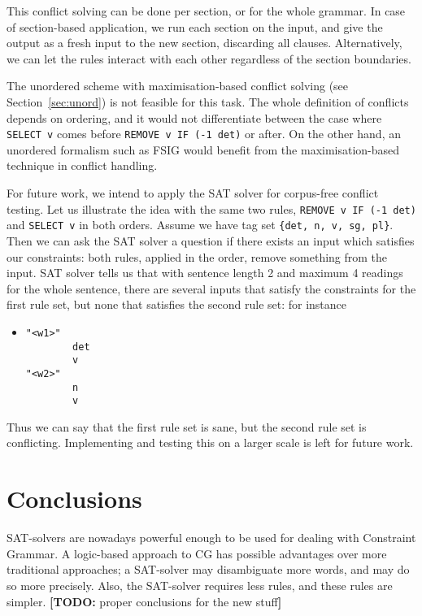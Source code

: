 \documentclass[11pt]{article}
\newcommand{\todo}[1]{{\color{cyan}\textbf{[TODO: }#1\textbf{]}}}
\begin{document}
This conflict solving can be done per section, or for the whole grammar. 
In case of section-based application, we run each section on the
input, and give the output as a fresh input to the new section, discarding
all clauses. Alternatively, we can let the rules interact with each
other regardless of the section boundaries.

The unordered scheme with maximisation-based conflict solving (see Section~\ref{sec:unord}) is not feasible for this task. 
The whole definition of conflicts depends on ordering, and it would
not differentiate between the case where \texttt{SELECT v} comes
before \texttt{REMOVE v IF (-1 det)} or after.
On the other hand, an unordered formalism such as FSIG would benefit from the
maximisation-based technique in conflict handling.

For future work, we intend to apply the SAT solver for corpus-free
conflict testing. Let us illustrate the idea with the same two rules,
\texttt{REMOVE v IF (-1 det)} and \texttt{SELECT v}
in both orders.
Assume we have tag set \texttt{\{det, n, v, sg, pl\}}. Then we
can ask the SAT solver a question if there exists an input which
satisfies our constraints: both rules, applied in the order, remove
something from the input.
SAT solver tells us that with sentence length 2 and maximum 4 readings
for the whole sentence, there are several inputs that
satisfy the constraints for the first rule set, but none that
satisfies the second rule set: for instance


\begin{itemize}
\item []
\begin{verbatim}
"<w1>"
        det
        v
"<w2>"
        n
        v
\end{verbatim}
\end{itemize}
Thus we can say that the first rule set is sane, but the second rule
set is conflicting. 
Implementing and testing this on a larger scale is left for future work.



\section{Conclusions}

SAT-solvers are nowadays powerful enough to be used for dealing with
Constraint Grammar. A logic-based approach to CG has possible
advantages over more traditional approaches; a SAT-solver may
disambiguate more words, and may do so more precisely. Also, the
SAT-solver requires less rules, and these rules are simpler. 
\todo{proper conclusions for the new stuff}
\end{document}

